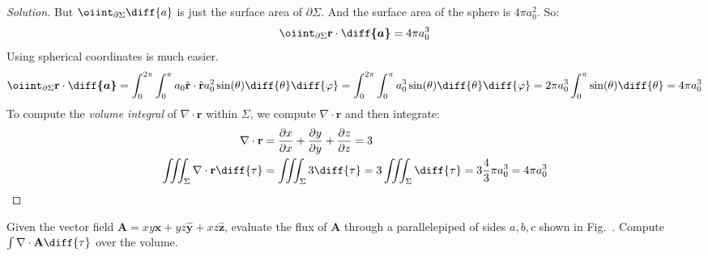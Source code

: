 \documentclass[crop=false,class=book,oneside]{standalone}
\begin{document}
\begin{proof}[Solution]
                But $\oiint_{\partial\Sigma}\diff{a}$
                is just the surface area of $\partial\Sigma$.
                And the surface area of the sphere
                is $4\pi{a_{0}^{2}}$. So:
                \begin{equation*}
                    \oiint_{\partial\Sigma}
                    \mathbf{r}\cdot\boldsymbol{\diff{a}}
                    =4\pi{a_{0}^{3}}
                \end{equation*}
                Using spherical coordinates is much easier.
                \begin{equation*}
                    \oiint_{\partial\Sigma}
                    \mathbf{r}\cdot\boldsymbol{\diff{a}}
                    =\int_{0}^{2\pi}\int_{0}^{\pi}a_{0}
                    \hat{\mathbf{r}}\cdot
                    \hat{\mathbf{r}}a_{0}^{2}
                    \sin(\theta)\diff{\theta}\diff{\varphi}
                    =\int_{0}^{2\pi}\int_{0}^{\pi}a_{0}^{3}
                    \sin(\theta)\diff{\theta}\diff{\varphi}
                    =2\pi a_{0}^{3}\int_{0}^{\pi}
                    \sin(\theta)\diff{\theta}=4\pi{a_{0}^{3}}
                \end{equation*}
                To compute the \textit{volume integral} of
                $\nabla\cdot\mathbf{r}$ within $\Sigma$,
                we compute $\nabla\cdot\mathbf{r}$
                and then integrate:
                \begin{align*}
                    \nabla\cdot\mathbf{r}
                    &=\frac{\partial{x}}{\partial{x}}
                    +\frac{\partial{y}}{\partial{y}}
                    +\frac{\partial{z}}{\partial{z}}=3\\
                    \iiint_{\Sigma}
                    \nabla\cdot\mathbf{r}\diff{\tau}
                    &=\iiint_{\Sigma}3\diff{\tau}
                     =3\iiint_{\Sigma}\diff{\tau}
                     =3\frac{4}{3}\pi{a_{0}^{3}}
                     =4\pi{a_{0}^{3}}
                \end{align*}
            \end{proof} 
            \begin{problem}[Wangsness 1-13]
                \label{problem:EMAG_1_wangsness_1_13}
                Given the vector field
                $\mathbf{A}=%
                 xy\hat{\mathbf{x}}%
                 +yz\hat{\mathbf{y}}%
                 +xz\hat{\mathbf{z}}$,
                evaluate the flux of $\mathbf{A}$
                through a parallelepiped of sides $a,b,c$
                shown in Fig.~.
                Compute $\int\nabla\cdot\mathbf{A}\diff{\tau}$
                over the volume.
            \end{problem}
\end{document}
